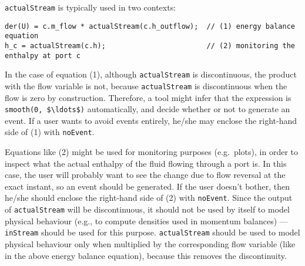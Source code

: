 \begin{nonnormative}
\lstinline!actualStream! is typically used in two contexts:
\begin{lstlisting}[language=modelica]
der(U) = c.m_flow * actualStream(c.h_outflow);  // (1) energy balance equation
h_c = actualStream(c.h);                        // (2) monitoring the enthalpy at port c
\end{lstlisting}
In the case of equation (1), although \lstinline!actualStream!
is discontinuous, the product with the flow variable is not, because
\lstinline!actualStream! is discontinuous when the flow is zero by construction.
Therefore, a tool might infer that the expression is \lstinline!smooth(0, $\ldots$)!
automatically, and decide whether or not to generate an event. If a user
wants to avoid events entirely, he/she may enclose the right-hand side
of (1) with \lstinline!noEvent!.

Equations like (2) might be used for monitoring purposes (e.g.\ plots), in order to inspect what the actual enthalpy of the fluid flowing through a port is.
In this case, the user will probably want to see the change due to flow reversal at the exact instant, so an event should be generated.  If the user doesn't
bother, then he/she should enclose the right-hand side of (2) with \lstinline!noEvent!.  Since the output of \lstinline!actualStream! will be discontinuous,
it should not be used by itself to model physical behaviour (e.g., to compute densities used in momentum balances) --- \lstinline!inStream! should be used
for this purpose.  \lstinline!actualStream! should be used to model physical behaviour only when multiplied by the corresponding flow variable (like in the
above energy balance equation), because this removes the discontinuity.
\end{nonnormative}
